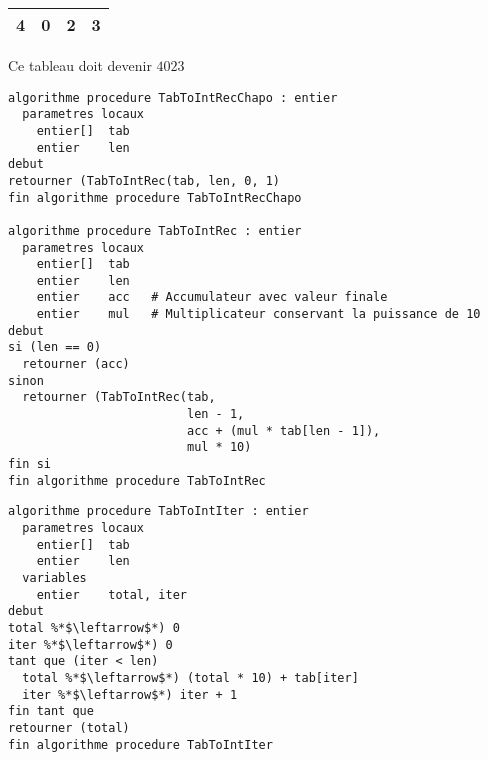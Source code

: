 \documentclass[11pt,a4paper]{article}
\begin{document}
\medskip

\begin{center}
  \begin{tabular}{| c | c | c | c |}
    \hline
    4 & 0 & 2 & 3 \\
    \hline
  \end{tabular}

  \smallskip

  Ce tableau doit devenir $ 4023 $
\end{center}

\medskip

\begin{center}

\begin{lstlisting}[style=algorithmique]
algorithme procedure TabToIntRecChapo : entier
  parametres locaux
    entier[]  tab
    entier    len
debut
retourner (TabToIntRec(tab, len, 0, 1)
fin algorithme procedure TabToIntRecChapo

algorithme procedure TabToIntRec : entier
  parametres locaux
    entier[]  tab
    entier    len
    entier    acc   # Accumulateur avec valeur finale
    entier    mul   # Multiplicateur conservant la puissance de 10
debut
si (len == 0)
  retourner (acc)
sinon
  retourner (TabToIntRec(tab,
                         len - 1,
                         acc + (mul * tab[len - 1]),
                         mul * 10)
fin si
fin algorithme procedure TabToIntRec \end{lstlisting}


\begin{lstlisting}[style=algorithmique]
algorithme procedure TabToIntIter : entier
  parametres locaux
    entier[]  tab
    entier    len
  variables
    entier    total, iter
debut
total %*$\leftarrow$*) 0
iter %*$\leftarrow$*) 0
tant que (iter < len)
  total %*$\leftarrow$*) (total * 10) + tab[iter]
  iter %*$\leftarrow$*) iter + 1
fin tant que
retourner (total)
fin algorithme procedure TabToIntIter \end{lstlisting}


\end{center}
\end{document}
